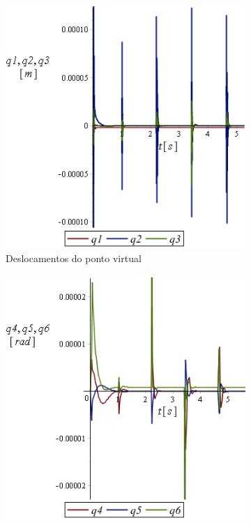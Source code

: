 \begin{figure}[h]
    \centering
    \begin{subfigure}[b]{0.45\textwidth}
        \includegraphics[width=\textwidth]{figs/t1_q123_base_testes}
        \caption{Deslocamentos do ponto virtual}
        \label{fig::t1_q123_base_testes}
    \end{subfigure}
    \quad %
    \begin{subfigure}[b]{0.45\textwidth}
        \includegraphics[width=\textwidth]{figs/t1_q456_base_testes}

\end{subfigure}
\end{figure}
